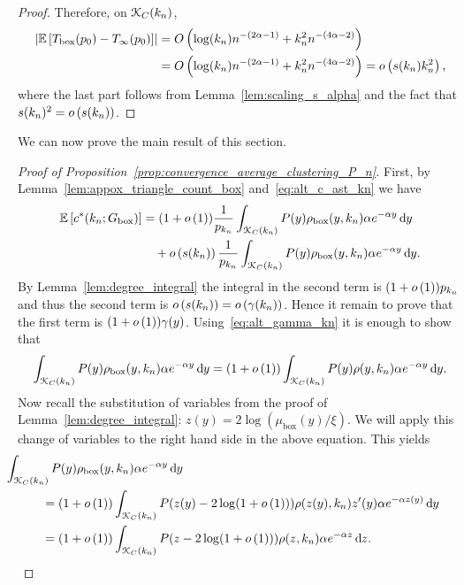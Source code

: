 \begin{proof}
Therefore, on ${\mathcal K}_C(k_n)$, 
\begin{align*}
	\left|\mathbb{E}\left[T_{\text{box}}(p_0) - T_{\infty}(p_0)\right]\right| 
	&= O\left(\log(k_n) n^{-(2\alpha - 1)} + k_n^2 n^{-(4\alpha - 2)}\right) \\
	&= O\left(\log(k_n) n^{-(2\alpha - 1)} + k_n^2 n^{-(4\alpha - 2)}\right) = o\left(s(k_n) k_n^2\right),
\end{align*}
where the last part follows from Lemma~\ref{lem:scaling_s_alpha} and the fact that $s(k_n)^2 = o\left(s(k_n)\right)$.
\end{proof}

We can now prove the main result of this section.

\begin{proof}[Proof of Proposition~\ref{prop:convergence_average_clustering_P_n}]
First, by Lemma~\ref{lem:appox_triangle_count_box} and~\eqref{eq:alt_c_ast_kn} we have
\begin{align*}
	\mathbb{E}\left[c^\ast(k_n;G_{\mathrm{box}})\right] &= (1 + o\left(1\right)) \frac{1}{p_{k_n}} \int_{{\mathcal K}_{C}(k_n)} P(y)
		\rho_{\mathrm{box}}(y,k_n) \alpha e^{-\alpha y} \operatorname{\mathrm{d}\hspace{-2pt}} y \\
	&\hspace{10pt}+ o\left(s(k_n)\right)	\frac{1}{p_{k_n}} \int_{{\mathcal K}_{C}(k_n)} P(y)
			\rho_{\mathrm{box}}(y,k_n) \alpha e^{-\alpha y} \operatorname{\mathrm{d}\hspace{-2pt}} y.
\end{align*}
By Lemma~\ref{lem:degree_integral} the integral in the second term is $(1+o\left(1\right)) p_{k_n}$ and thus the second term is $o\left(s(k_n)\right) = o\left(\gamma(k_n)\right)$. Hence it remain to prove that the first term is $(1+o\left(1\right)) \gamma(y)$. Using~\eqref{eq:alt_gamma_kn} it is enough to show that
\[
	\int_{{\mathcal K}_{C}(k_n)} P(y) \rho_{\mathrm{box}}(y,k_n) \alpha e^{-\alpha y} \operatorname{\mathrm{d}\hspace{-2pt}} y
	= (1+o\left(1\right)) \int_{{\mathcal K}_{C}(k_n)} P(y) \rho(y,k_n) \alpha e^{-\alpha y} \operatorname{\mathrm{d}\hspace{-2pt}} y.
\]
Now recall the substitution of variables from the proof of Lemma~\ref{lem:degree_integral}: $z(y) = 2 \log(\mu_{\mathrm{box}}(y)/\xi)$. We will apply this change of variables to the right hand side in the above equation. This yields
\begin{align*}
	&\hspace{-30pt}\int_{\Kcal_{C}(k_n)} P(y) \rho_{\mathrm{box}}(y,k_n) \alpha e^{-\alpha y} \dd y\\
	&= (1+\smallO{1}) \int_{\Kcal_C(k_n)} P(z(y) - 2\log(1+\smallO{1})) \rho(z(y),k_n) 
		z^\prime(y) \alpha e^{-\alpha z(y)} \dd y\\
	&= (1+\smallO{1}) \int_{\Kcal_C(k_n)} P(z - 2\log(1+\smallO{1})) \rho(z,k_n) \alpha e^{-\alpha z} \dd z.
\end{align*}

\end{proof}
